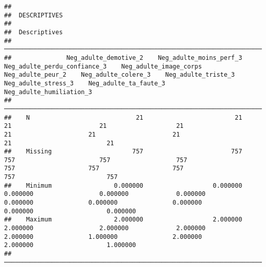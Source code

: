 \documentclass[
]{article}
\begin{document}
\begin{verbatim}
## 
##  DESCRIPTIVES
## 
##  Descriptives                                                                                                                                                                                                                                                             
##  ──────────────────────────────────────────────────────────────────────────────────────────────────────────────────────────────────────────────────────────────────────────────────────────────────────────────────────────────────────────────────────────────────────── 
##               Neg_adulte_demotive_2    Neg_adulte_moins_perf_3    Neg_adulte_perdu_confiance_3    Neg_adulte_image_corps    Neg_adulte_peur_2    Neg_adulte_colere_3    Neg_adulte_triste_3    Neg_adulte_stress_3    Neg_adulte_ta_faute_3    Neg_adulte_humiliation_3   
##  ──────────────────────────────────────────────────────────────────────────────────────────────────────────────────────────────────────────────────────────────────────────────────────────────────────────────────────────────────────────────────────────────────────── 
##    N                             21                         21                              21                        21                   21                     21                     21                     21                       21                          21   
##    Missing                      757                        757                             757                       757                  757                    757                    757                    757                      757                         757   
##    Minimum                 0.000000                   0.000000                        0.000000                  0.000000             0.000000               0.000000               0.000000               0.000000                 0.000000                    0.000000   
##    Maximum                 2.000000                   2.000000                        2.000000                  2.000000             2.000000               2.000000               1.000000               2.000000                 2.000000                    1.000000   
##  ────────────────────────────────────────────────────────────────────────────────────────────────────────────────────────────────────────────────────────────────────────────────────────────────────────────────────────────────────────────────────────────────────────
\end{verbatim}
\end{document}
